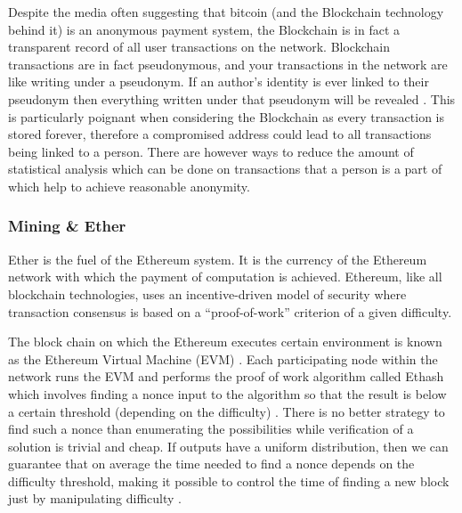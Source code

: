 \documentclass{article}
\begin{document}
Despite the media often suggesting that bitcoin (and the Blockchain technology behind it) is an anonymous payment system, the Blockchain is in fact a transparent record of all user transactions on the network. Blockchain transactions are in fact pseudonymous, and your transactions in the network are like writing under a pseudonym. If an author's identity is ever linked to their pseudonym then everything written under that pseudonym will be revealed \citep{28_anonymity_2016}. This is particularly poignant when considering the Blockchain as every transaction is stored forever, therefore a compromised address could lead to all transactions being linked to a person. There are however ways to reduce the amount of statistical analysis which can be done on transactions that a person is a part of which help to achieve reasonable anonymity.

\cleardoublepage
\subsubsection{Mining \& Ether}
Ether is the fuel of the Ethereum system. It is the currency of the Ethereum network with which the payment of computation is achieved. Ethereum, like all blockchain technologies, uses an incentive-driven model of security where transaction consensus is based on a ``proof-of-work'' criterion of a given difficulty.

The block chain on which the Ethereum executes certain environment is known as the Ethereum Virtual Machine (EVM) \citep{54_ethereum_explained_2017}. Each participating node within the network runs the EVM and performs the proof of work algorithm called Ethash which involves finding a nonce input to the algorithm so that the result is below a certain threshold (depending on the difficulty) \citep{57_introduction_ethereum_frontier_guide_2017}. There is no better strategy to find such a nonce than enumerating the possibilities while verification of a solution is trivial and cheap. If outputs have a uniform distribution, then we can guarantee that on average the time needed to find a nonce depends on the difficulty threshold, making it possible to control the time of finding a new block just by manipulating difficulty \citep{57_introduction_ethereum_frontier_guide_2017}.
\end{document}

